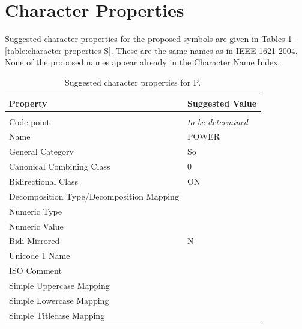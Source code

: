 \documentclass[10pt,a4paper]{article}
\newcommand{\IEC}[1]{{\fontspec{IECpower}#1}}
\begin{document}
\section{Character Properties}

Suggested character properties for the proposed symbols are given in Tables
\ref{table:character-properties-P}--\ref{table:character-properties-S}. These
are the same names as in IEEE 1621-2004. None of the proposed names appear
already in the Character Name Index.

\begin{table}[htbp]
	\centering
	\begin{tabular}{ll}
		\textbf{Property} & \textbf{Suggested Value} \\
		\hline \\
		Code point                & \emph{to be determined} \\
		Name                      & POWER \\
		General Category          & So \\
		Canonical Combining Class & 0 \\
		Bidirectional Class       & ON \\
		Decomposition Type/Decomposition Mapping \\
		Numeric Type \\
		Numeric Value \\
		Bidi Mirrored             & N \\
		Unicode 1 Name \\
		ISO Comment \\
		Simple Uppercase Mapping \\
		Simple Lowercase Mapping \\
		Simple Titlecase Mapping \\
    \end{tabular}
    \caption{Suggested character properties for \IEC{P}.}
    \label{table:character-properties-P} %
\end{table}
\end{document}
